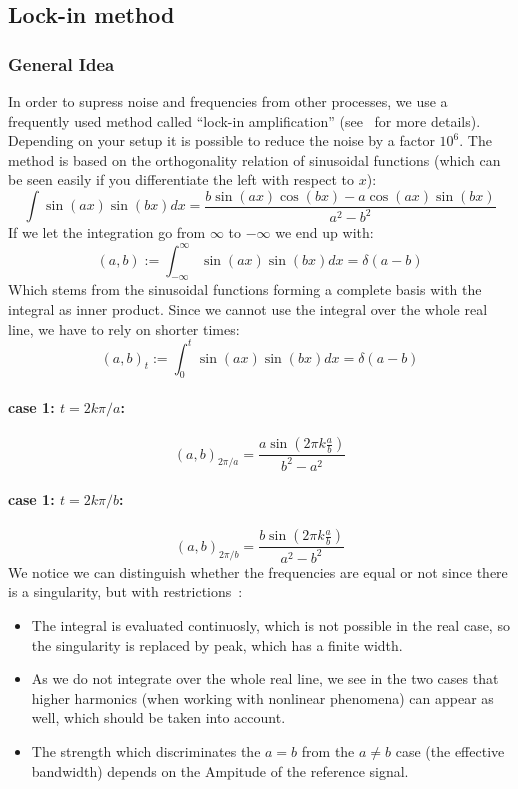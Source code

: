 \subsection{Lock-in method}
\subsubsection{General Idea}
\label{ssub:General Idea}

In order to supress noise and frequencies from other processes, we use
a frequently used method called ``lock-in amplification''
(see~\cite{lockin} for more details). Depending on your
setup it is possible to reduce the noise by a factor $10^6$. The method
is based on the orthogonality relation of sinusoidal functions (which
can be seen easily if you differentiate the left with respect to $x$):
\begin{equation}
    \int \sin(a x) \sin(b x) dx =\frac{ b \sin(a x) \cos(b x)-a \cos(a x)
            \sin(b x)}{a^2-b^2}
\end{equation}
If we let the integration go from $\infty$ to $-\infty$ we end up with:
\begin{equation}
    (a,b) := \int_{-\infty}^{\infty} \sin(a x) \sin(b x) dx = \delta(a - b)
\end{equation}
Which stems from the sinusoidal functions forming a complete basis with
the integral as inner product.
Since we cannot use the integral over the whole real line, we have to rely
on shorter times: 
\begin{equation}
    (a,b)_t := \int_{0}^{t} \sin(a x) \sin(b x) dx = \delta(a - b)
\end{equation}
\paragraph{case 1: $t = 2k\pi /a$:}
\begin{equation}
    (a,b)_{2\pi /a} = \frac{a \sin(2\pi k\frac{a}{b})}{b^2 - a^2}
\end{equation}
\paragraph{case 1: $t = 2k\pi /b$:}
\begin{equation}
    (a,b)_{2\pi /b} = \frac{b \sin(2\pi k\frac{a}{b})}{a^2 - b^2}
\end{equation}
We notice we can distinguish whether the frequencies are equal or not 
since there is a singularity, but with restrictions~\cite{lockin}:
\begin{itemize}
    \item The integral is evaluated continuosly, which is not possible
        in the real case, so the singularity is replaced by peak, which
        has a finite width.
\item As we do not integrate over the whole real line, we see in the two
    cases that higher harmonics (when working with nonlinear phenomena)
    can appear as well, which should be taken into account.
\item The strength which discriminates the $a=b$ from the $a\neq b$ case
    (the effective bandwidth)
    depends on the Ampitude of the reference signal. 
\end{itemize}

